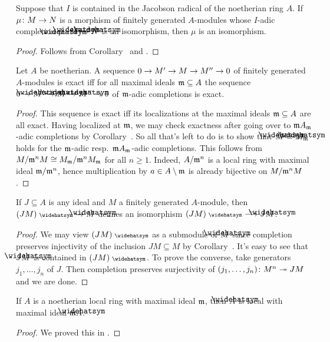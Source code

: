 \documentclass[a4paper,parskip=half,numbers=enddot, DIV=12]{scrreprt}
\renewcommand{\geq}{\geqslant}
\begin{document}
\begin{cor}
	Suppose that $I$ is contained in the Jacobson radical of the noetherian ring $A$. If $\mu\colon M\morphism N$ is a morphism of finitely generated $A$-modules whose $I$-adic completion $\roof{\mu}\colon \roof{M}\morphism\roof{N}$ is an isomorphism, then $\mu$ is an isomorphism.
\end{cor}
\begin{proof}
	Follows from Corollary~ and .
\end{proof}
\begin{cor}
	Let $A$ be noetherian. A sequence $0\morphism M'\morphism M\morphism M''\morphism 0$ of finitely generated $A$-modules is exact iff for all maximal ideals $\mathfrak{m}\subseteq A$ the sequence $0\morphism\roof{M}'\morphism \roof{M}\morphism \roof{M}''\morphism 0$ of $\mathfrak{m}$-adic completions is exact.
\end{cor}
\begin{proof}
	This sequence is exact iff its localizations at the maximal ideals $\mathfrak{m}\subseteq A$ are all exact. Having localized at $\mathfrak{m}$, we may check exactness after going over to $\mathfrak{m} A_{\mathfrak{m}}$-adic completions by Corollary~. So all that's left to do is to show that $\roof{M}\cong \roof{M}_\mm$ holds for the $\mathfrak{m}$-adic resp.\ $\mathfrak{m} A_{\mathfrak{m}}$-adic completions. This follows from $M/\mathfrak{m}^nM\cong M_{\mathfrak{m}}/\mathfrak{m}^nM_{\mathfrak{m}}$ for all $n\geq 1$. Indeed, $A/\mathfrak{m}^n$ is a local ring with maximal ideal $\mathfrak{m}/\mathfrak{m}^n$, hence multiplication by $a\in A\setminus \mathfrak{m}$ is already bijective on $M/\mathfrak{m}^nM$.
\end{proof}
\begin{cor}
	If $J\subseteq A$ is any ideal and $M$ a finitely generated $A$-module, then $(JM)^\complete\morphism\roof{M}$ defines an isomorphism $(JM)^\complete\isomorphism J\roof{M}$.
\end{cor}
\begin{proof}
	We may view $(JM)^\complete$ as a submodule of $\roof{M}$ since completion preserves injectivity of the inclusion $JM\subseteq M$ by Corollary~. It's easy to see that $J\roof{M}$ is contained in $(JM)^\complete$. To prove the converse, take generators $j_1,\ldots,j_n$ of $J$. Then completion preserves surjectivity of $(j_1,\ldots,j_n)\colon M^n\epimorphism JM$ and we are done.
\end{proof}
\begin{cor}
	If $A$ is a noetherian local ring with maximal ideal $\mathfrak{m}$, then $\roof{A}$ is local with maximal ideal $\mm \roof{A}$.
\end{cor}
\begin{proof}
	We proved this in \cite[Corollary~2.2.2]{homalg}.
\end{proof}
\end{document}
